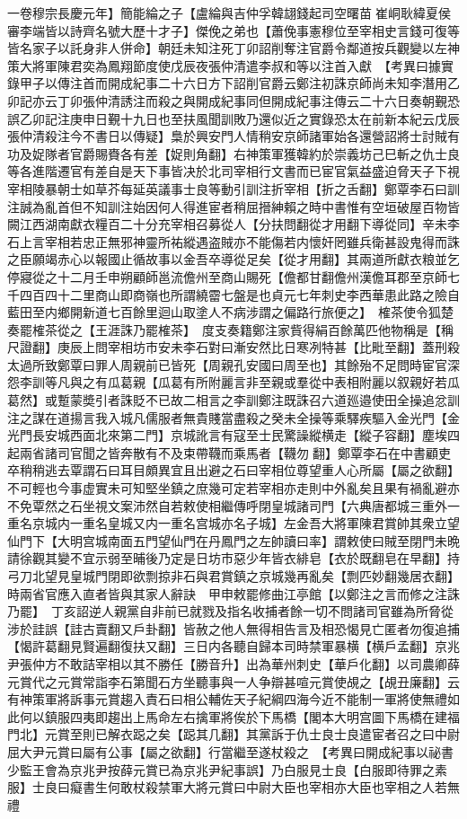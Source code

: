 一卷穆宗長慶元年】簡能綸之子【盧綸與吉仲孚韓翃錢起司空曙苗崔峒耿緯夏侯審李端皆以詩齊名號大歷十才子】傑俛之弟也【蕭俛事憲穆位至宰相史言錢可復等皆名家子以託身非人併命】朝廷未知注死丁卯詔削奪注官爵令鄰道按兵觀變以左神策大將軍陳君奕為鳳翔節度使戊辰夜張仲清遣李叔和等以注首入獻　【考異曰據實錄甲子以傳注首而開成紀事二十六日方下詔削官爵云鄭注初誅京師尚未知李潛用乙卯記亦云丁卯張仲清誘注而殺之與開成紀事同但開成紀事注傳云二十六日奏朝覲恐誤乙卯記注庚申日覲十九日也至扶風聞訓敗乃還似近之實錄恐太在前新本紀云戊辰張仲清殺注今不書日以傳疑】梟於興安門人情稍安京師諸軍始各還營詔將士討賊有功及娖隊者官爵賜賚各有差【娖則角翻】右神策軍獲韓約於崇義坊己巳斬之仇士良等各進階遷官有差自是天下事皆决於北司宰相行文書而已宦官氣益盛迫脅天子下視宰相陵暴朝士如草芥每延英議事士良等動引訓注折宰相【折之舌翻】鄭覃李石曰訓注誠為亂首但不知訓注始因何人得進宦者稍屈搢紳賴之時中書惟有空垣破屋百物皆闕江西湖南獻衣糧百二十分充宰相召募從人【分扶問翻從才用翻下導從同】辛未李石上言宰相若忠正無邪神靈所祐縱遇盗賊亦不能傷若内懷奸罔雖兵衛甚設鬼得而誅之臣願竭赤心以報國止循故事以金吾卒導從足矣【從才用翻】其兩道所獻衣粮並乞停寢從之十二月壬申朔顧師邕流儋州至商山賜死【儋都甘翻儋州漢儋耳郡至京師七千四百四十二里商山即商嶺也所謂繞霤七盤是也貞元七年刺史李西華患此路之險自藍田至内鄉開新道七百餘里迴山取塗人不病涉謂之偏路行旅便之】　榷茶使令狐楚奏罷榷茶從之【王涯誅乃罷榷茶】　度支奏籍鄭注家貲得絹百餘萬匹他物稱是【稱尺證翻】庚辰上問宰相坊市安未李石對曰漸安然比日寒冽特甚【比毗至翻】蓋刑殺太過所致鄭覃曰罪人周親前已皆死【周親孔安國曰周至也】其餘殆不足問時宦官深怨李訓等凡與之有瓜葛親【瓜葛有所附麗言非至親或羣從中表相附麗以叙親好若瓜葛然】或蹔蒙奬引者誅貶不已故二相言之李訓鄭注既誅召六道廵邉使田全操追忿訓注之謀在道揚言我入城凡儒服者無貴賤當盡殺之癸未全操等乘驛疾驅入金光門【金光門長安城西面北來第二門】京城訛言有寇至士民驚譟縱横走【縱子容翻】塵埃四起兩省諸司官聞之皆奔散有不及束帶韈而乘馬者【韈勿翻】鄭覃李石在中書顧吏卒稍稍逃去覃謂石曰耳目頗異宜且出避之石曰宰相位尊望重人心所屬【屬之欲翻】不可輕也今事虚實未可知堅坐鎮之庶幾可定若宰相亦走則中外亂矣且果有禍亂避亦不免覃然之石坐視文案沛然自若敕使相繼傳呼閉皇城諸司門【六典唐都城三重外一重名京城内一重名皇城又内一重名宫城亦名子城】左金吾大將軍陳君賞帥其衆立望仙門下【大明宫城南面五門望仙門在丹鳳門之左帥讀曰率】謂敕使曰賊至閉門未晩請徐觀其變不宜示弱至晡後乃定是日坊市惡少年皆衣緋皂【衣於既翻皂在早翻】持弓刀北望見皇城門閉即欲剽掠非石與君賞鎮之京城幾再亂矣【剽匹妙翻幾居衣翻】時兩省官應入直者皆與其家人辭訣　甲申敕罷修曲江亭館【以鄭注之言而修之注誅乃罷】　丁亥詔逆人親黨自非前已就戮及指名收捕者餘一切不問諸司官雖為所脅從涉於詿誤【詿古賣翻又戶卦翻】皆赦之他人無得相告言及相恐愒見亡匿者勿復追捕【愒許葛翻見賢遍翻復扶又翻】三日内各聽自歸本司時禁軍暴横【横戶孟翻】京兆尹張仲方不敢詰宰相以其不勝任【勝音升】出為華州刺史【華戶化翻】以司農卿薛元賞代之元賞常詣李石第聞石方坐聽事與一人争辯甚喧元賞使覘之【覘丑廉翻】云有神策軍將訴事元賞趨入責石曰相公輔佐天子紀綱四海今近不能制一軍將使無禮如此何以鎮服四夷即趨出上馬命左右擒軍將俟於下馬橋【閣本大明宫圖下馬橋在建福門北】元賞至則已解衣跽之矣【跽其几翻】其黨訴于仇士良士良遣宦者召之曰中尉屈大尹元賞曰屬有公事【屬之欲翻】行當繼至遂杖殺之　【考異曰開成紀事以祕書少監王會為京兆尹按薛元賞已為京兆尹紀事誤】乃白服見士良【白服即待罪之素服】士良曰癡書生何敢杖殺禁軍大將元賞曰中尉大臣也宰相亦大臣也宰相之人若無禮